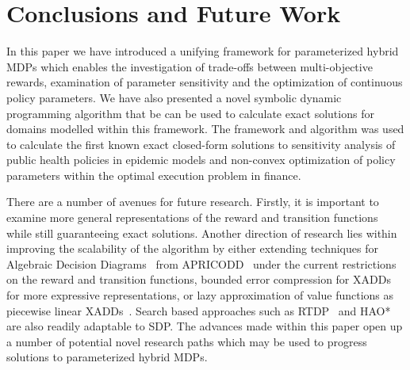 \section{Conclusions and Future Work}
\label{sec:conclusion}

In this paper we have introduced a unifying framework for parameterized hybrid MDPs which enables the investigation of trade-offs between multi-objective rewards, examination of parameter sensitivity and the optimization of continuous policy parameters. We have also presented a novel symbolic dynamic programming algorithm that be can be used to calculate exact solutions for domains modelled within this framework. The framework and algorithm was used to calculate the first known exact closed-form solutions to sensitivity analysis of public health policies in epidemic models and non-convex optimization of policy parameters within the optimal execution problem in finance.

There are a number of avenues for future research. Firstly, it is important to examine more general representations of the reward and transition functions while still guaranteeing exact solutions. Another direction of research lies within improving the scalability of the algorithm by either extending techniques for Algebraic Decision Diagrams~\parencite{Bahar_JoFMiSD_1993} from APRICODD~\parencite{St-Aubin_NIPS_2000} under the current restrictions on the reward and transition functions, bounded error compression for 
XADDs~\parencite{Vianna_UAI_2013} for more expressive representations, or lazy approximation of value functions as piecewise linear XADDs~\parencite{Li_AAAI_2005}. Search based approaches such as RTDP~\parencite{Barto_AI_1995} and HAO*~\parencite{Meuleau_JoAIR_2009}
are also readily adaptable to SDP. The advances made within this paper open up a number of potential novel research paths which may be used to progress solutions to parameterized hybrid MDPs.